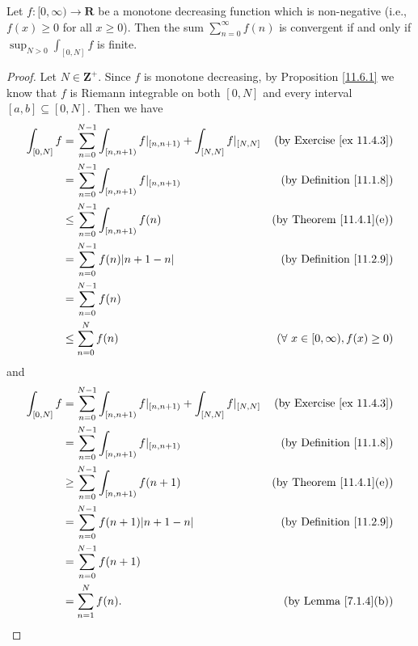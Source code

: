 \begin{proposition}\label{11.6.4}
    Let \(f : [0, \infty) \to \mathbf{R}\) be a monotone decreasing function which is non-negative
    (i.e., \(f(x) \geq 0\) for all \(x \geq 0\)).
    Then the sum \(\sum_{n = 0}^\infty f(n)\) is convergent if and only if \(\sup_{N > 0} \int_{[0, N]} f\) is finite.
\end{proposition}

\begin{proof}
    Let \(N \in \mathbf{Z}^+\).
    Since \(f\) is monotone decreasing, by Proposition \ref{11.6.1} we know that \(f\) is Riemann integrable on both \([0, N]\) and every interval \([a, b] \subseteq [0, N]\).
    Then we have
    \begin{align*}
        \int_{[0, N]} f & = \sum_{n = 0}^{N - 1} \int_{[n, n + 1)} f|_{[n, n + 1)} + \int_{[N, N]} f|_{[N, N]} & \text{(by Exercise \ref{ex 11.4.3})}      \\
                        & = \sum_{n = 0}^{N - 1} \int_{[n, n + 1)} f|_{[n, n + 1)}                             & \text{(by Definition \ref{11.1.8})}       \\
                        & \leq \sum_{n = 0}^{N - 1} \int_{[n, n + 1)} f(n)                                     & \text{(by Theorem \ref{11.4.1}(e))}       \\
                        & = \sum_{n = 0}^{N - 1} f(n) \abs*{n + 1 - n}                                         & \text{(by Definition \ref{11.2.9})}       \\
                        & = \sum_{n = 0}^{N - 1} f(n)                                                                                                      \\
                        & \leq \sum_{n = 0}^N f(n)                                                             & (\forall\ x \in [0, \infty), f(x) \geq 0)
    \end{align*}
    and
    \begin{align*}
        \int_{[0, N]} f & = \sum_{n = 0}^{N - 1} \int_{[n, n + 1)} f|_{[n, n + 1)} + \int_{[N, N]} f|_{[N, N]} & \text{(by Exercise \ref{ex 11.4.3})} \\
                        & = \sum_{n = 0}^{N - 1} \int_{[n, n + 1)} f|_{[n, n + 1)}                             & \text{(by Definition \ref{11.1.8})}  \\
                        & \geq \sum_{n = 0}^{N - 1} \int_{[n, n + 1)} f(n + 1)                                 & \text{(by Theorem \ref{11.4.1}(e))}  \\
                        & = \sum_{n = 0}^{N - 1} f(n + 1) \abs*{n + 1 - n}                                     & \text{(by Definition \ref{11.2.9})}  \\
                        & = \sum_{n = 0}^{N - 1} f(n + 1)                                                                                             \\
                        & = \sum_{n = 1}^N f(n).                                                               & \text{(by Lemma \ref{7.1.4}(b))}
    \end{align*}


\end{proof}
